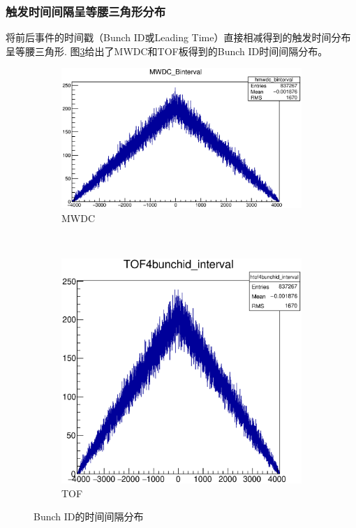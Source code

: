 \subsubsection*{触发时间间隔呈等腰三角形分布}
将前后事件的时间戳（Bunch ID或Leading Time）直接相减得到的触发时间分布呈等腰三角形.
图\ref{fig:bunchid_interval}给出了MWDC和TOF板得到的Bunch ID时间间隔分布。
\begin{figure}[htbp]
	\centering
	\begin{subfigure}[b]{0.48\textwidth}
        \includegraphics[width=\textwidth]{fig/mwdc_bunchid_interval.eps}
        \caption{MWDC}
        \label{fig:mwdc_bunchid_interval}
    \end{subfigure}
    ~
    \begin{subfigure}[b]{0.48\textwidth}
        \includegraphics[width=\textwidth]{fig/tof_bunchid_interval.eps}
        \caption{TOF}
        \label{fig:tof_bunchid_interval}
    \end{subfigure}
	\caption{Bunch ID的时间间隔分布}
	\label{fig:bunchid_interval}
\end{figure}

